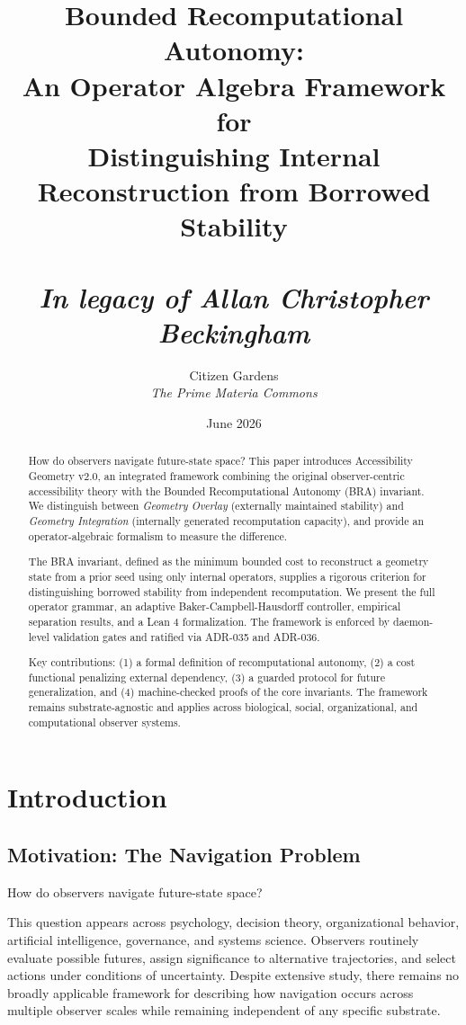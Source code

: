 \documentclass[12pt]{article}
\title{
    \textbf{Bounded Recomputational Autonomy:} \\
    \large An Operator Algebra Framework for \\
    Distinguishing Internal Reconstruction from Borrowed Stability \\ 
\\ \Large\textit{In legacy of Allan Christopher Beckingham}}
\author{Citizen Gardens \\  \textit{The Prime Materia Commons}} \\
\date{June 2026}
\theoremstyle{plain}
\theoremstyle{definition}
\theoremstyle{remark}
\begin{document}
\maketitle

\begin{abstract}
How do observers navigate future-state space? This paper introduces Accessibility Geometry v2.0, an integrated framework combining the original observer-centric accessibility theory with the Bounded Recomputational Autonomy (BRA) invariant. We distinguish between \emph{Geometry Overlay} (externally maintained stability) and \emph{Geometry Integration} (internally generated recomputation capacity), and provide an operator-algebraic formalism to measure the difference.

The BRA invariant, defined as the minimum bounded cost to reconstruct a geometry state from a prior seed using only internal operators, supplies a rigorous criterion for distinguishing borrowed stability from independent recomputation. We present the full operator grammar, an adaptive Baker-Campbell-Hausdorff controller, empirical separation results, and a Lean 4 formalization. The framework is enforced by daemon-level validation gates and ratified via ADR-035 and ADR-036.

Key contributions: (1) a formal definition of recomputational autonomy, (2) a cost functional penalizing external dependency, (3) a guarded protocol for future generalization, and (4) machine-checked proofs of the core invariants. The framework remains substrate-agnostic and applies across biological, social, organizational, and computational observer systems.
\end{abstract}
\newpage
\tableofcontents
\newpage
\section{Introduction}

\subsection{Motivation: The Navigation Problem}

How do observers navigate future-state space?

This question appears across psychology, decision theory, organizational behavior, artificial intelligence, governance, and systems science. Observers routinely evaluate possible futures, assign significance to alternative trajectories, and select actions under conditions of uncertainty. Despite extensive study, there remains no broadly applicable framework for describing how navigation occurs across multiple observer scales while remaining independent of any specific substrate.
\end{document}
